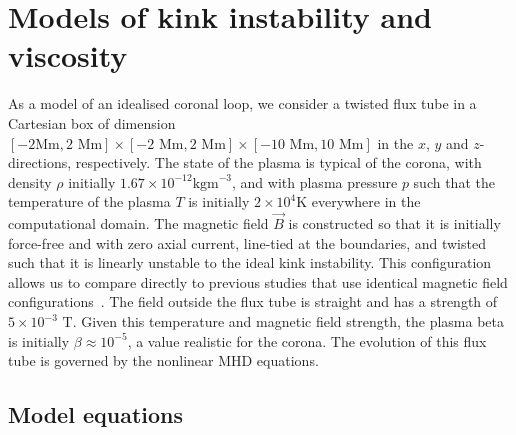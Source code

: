 \section{Models of kink instability and viscosity}
\label{sec:model-setup}

As a model of an idealised coronal loop, we consider a
twisted flux tube in a Cartesian box of dimension $[-2\text{
    Mm},2\text{ Mm}] \times [-2\text{ Mm},2\text{ Mm}] \times
   [-10\text{ Mm},10\text{ Mm}]$ in the $x$, $y$ and $z$-directions,
   respectively. The state of the plasma is typical of the corona,
   with density $\rho$ initially $1.67\times 10^{-12} \text{
     kgm}^{-3}$, and with plasma pressure $p$ such that the
   temperature of the plasma $T$ is initially $2\times10^{4} \text{
     K}$ everywhere in the computational domain. The magnetic
   field $\vec{B}$ is constructed so that it is initially force-free
   and with zero axial current, line-tied at the boundaries, and
   twisted such that it is linearly unstable to the ideal kink
   instability. This configuration allows us to compare directly to
   previous studies that use identical magnetic field
   configurations~\cite{hoodCoronalHeatingMagnetic2009,barefordShockHeatingNumerical2015,bothaOBSERVATIONALSIGNATURESCORONAL2012}. The
   field outside the flux tube is straight and has a strength of
   $5\times10^{-3} \text{ T}$. Given this temperature and magnetic
   field strength, the plasma beta is initially $\beta \approx
   10^{-5}$, a value realistic for the corona. The evolution of
   this flux tube is governed by the nonlinear MHD equations.

\subsection{Model equations}

